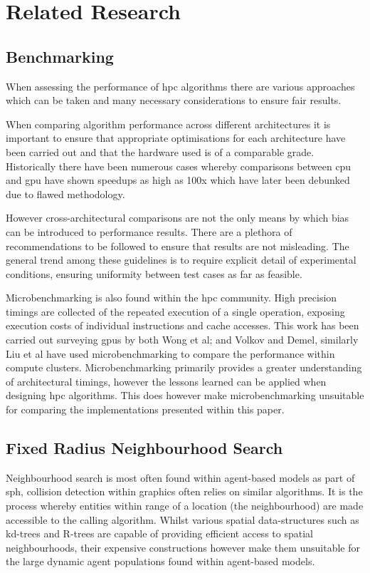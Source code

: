 \section{Related Research\label{sec:related-work}}
  \subsection{Benchmarking}  
    When assessing the performance of \gls{hpc} algorithms there are various approaches which can be taken and many necessary considerations to ensure fair results.
    
    When comparing algorithm performance across different architectures it is important to ensure that appropriate optimisations for each architecture have been carried out and that the hardware used is of a comparable grade. Historically there have been numerous cases whereby comparisons between \gls{cpu} and \gls{gpu} have shown speedups as high as 100x which have later been debunked due to flawed methodology\cite{LK*10}.
    
    However cross-architectural comparisons are not the only means by which bias can be introduced to performance results. There are a plethora of recommendations to be followed to ensure that results are not misleading\cite{Bai92}. The general trend among these guidelines is to require explicit detail of experimental conditions, ensuring uniformity between test cases as far as feasible.
      
    Microbenchmarking is also found within the \gls{hpc} community. High precision timings are collected of the repeated execution of a single operation, exposing execution costs of individual instructions and cache accesses. This work has been carried out surveying \glspl{gpu} by both Wong et al\cite{WP*10}; and Volkov and Demel\cite{VD08}, similarly Liu et al have used microbenchmarking to compare the performance within compute clusters\cite{LC*04}. Microbenchmarking primarily provides a greater understanding of architectural timings, however the lessons learned can be applied when designing \gls{hpc} algorithms. This does however make microbenchmarking unsuitable for comparing the implementations presented within this paper.
    
  \subsection{Fixed Radius Neighbourhood Search}
    Neighbourhood search is most often found within agent-based models as part of \gls{sph}, collision detection within graphics often relies on similar algorithms. It is the process whereby entities within range of a location (the neighbourhood) are made accessible to the calling algorithm. Whilst various spatial data-structures such as kd-trees and R-trees are capable of providing efficient access to spatial neighbourhoods, their expensive constructions however make them unsuitable for the large dynamic agent populations found within agent-based models.
    
